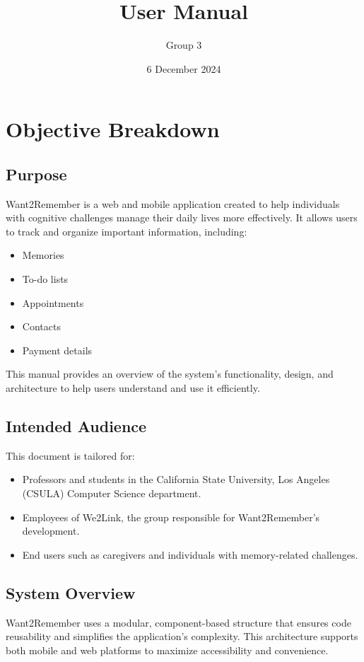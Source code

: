 \documentclass{article}
\title{User Manual}
\author{Group 3}
\date{6 December 2024}
\begin{document}
\maketitle
\newpage

\section{Objective Breakdown}

\subsection{Purpose}
Want2Remember is a web and mobile application created to help individuals with cognitive challenges manage their daily lives more effectively. It allows users to track and organize important information, including:

\begin{itemize}
\item Memories
\item To-do lists
\item Appointments
\item Contacts
\item Payment details
\end{itemize}

This manual provides an overview of the system’s functionality, design, and architecture to help users understand and use it efficiently.

\subsection{Intended Audience}
This document is tailored for:

\begin{itemize}
\item Professors and students in the California State University, Los Angeles (CSULA) Computer Science department.
\item Employees of We2Link, the group responsible for Want2Remember’s development.
\item End users such as caregivers and individuals with memory-related challenges.
\end{itemize}

\subsection{System Overview}
Want2Remember uses a modular, component-based structure that ensures code reusability and simplifies the application’s complexity. This architecture supports both mobile and web platforms to maximize accessibility and convenience.
\end{document}
